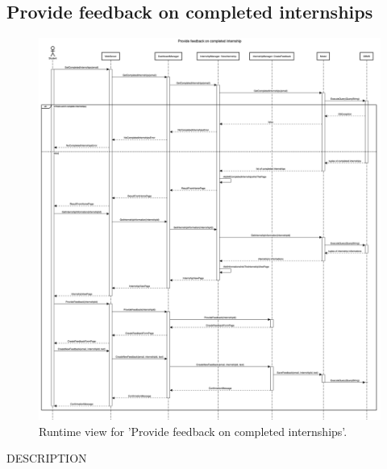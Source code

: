\subsection{Provide feedback on completed internships}
\begin{figure}[H]
    \begin{center}
        \includegraphics[width=0.8\linewidth]{DD/LaTeX/Images/RuntimeView/ProvideFeedbackOnCompletedInternships.png}
        \caption{Runtime view for 'Provide feedback on completed internships'.}
        \label{fig:runtime_ProvideFeedbackOnCompletedInternships}%
    \end{center}
\end{figure}

DESCRIPTION


